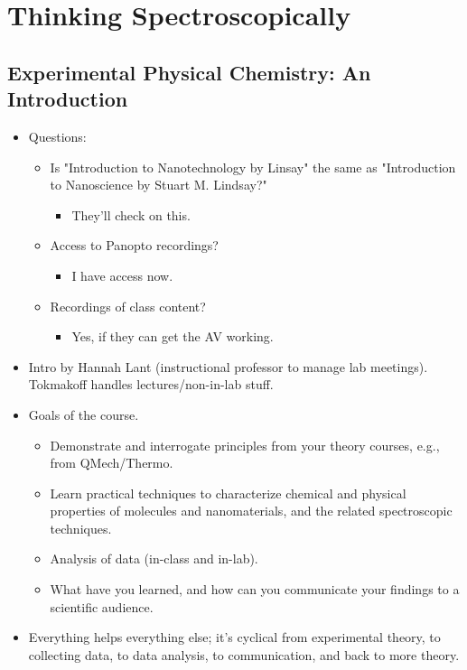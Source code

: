 \documentclass[../notes.tex]{subfiles}
\begin{document}
\chapter{Thinking Spectroscopically}
\section{Experimental Physical Chemistry: An Introduction}
\begin{itemize}
    \item {}Questions:
    \begin{itemize}
        \item Is "Introduction to Nanotechnology by Linsay" the same as "Introduction to Nanoscience by Stuart M. Lindsay?"
        \begin{itemize}
            \item They'll check on this.
        \end{itemize}
        \item Access to Panopto recordings?
        \begin{itemize}
            \item I have access now.
        \end{itemize}
        \item Recordings of class content?
        \begin{itemize}
            \item Yes, if they can get the AV working.
        \end{itemize}
    \end{itemize}
    \item Intro by Hannah Lant (instructional professor to manage lab meetings). Tokmakoff handles lectures/non-in-lab stuff.
    \item Goals of the course.
    \begin{itemize}
        \item Demonstrate and interrogate principles from your theory courses, e.g., from QMech/Thermo.
        \item Learn practical techniques to characterize chemical and physical properties of molecules and nanomaterials, and the related spectroscopic techniques.
        \item Analysis of data (in-class and in-lab).
        \item What have you learned, and how can you communicate your findings to a scientific audience.
    \end{itemize}
    \item Everything helps everything else; it's cyclical from experimental theory, to collecting data, to data analysis, to communication, and back to more theory.

\end{itemize}
\end{document}
